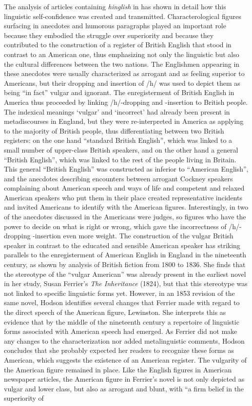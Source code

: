 The analysis of articles containing \emph{hinglish} in  has shown in detail how this linguistic self-confidence was created and transmitted. Characterological figures surfacing in anecdotes and humorous paragraphs played an important role because they embodied the struggle over superiority and because they contributed to the construction of a register of British English that stood in contrast to an American one, thus emphasizing not only the linguistic but also the cultural differences between the two nations. The Englishmen appearing in these anecdotes were usually characterized as arrogant and as feeling superior to Americans, but their dropping and insertion of /h/ was used to depict them as being “in fact” vulgar and ignorant. The enregisterment of British English in America thus proceeded by linking /h/-dropping and -insertion to British people. The indexical meanings ‘vulgar’ and ‘incorrect’ had already been present in metadiscourses in England, but they were re-interpreted in America as applying to the majority of British people, thus differentiating between two British registers: on the one hand “standard British English”, which was linked to a small number of upper-class British speakers, and on the other hand a general “British English”, which was linked to the rest of the people living in Britain. This general “British English” was constructed as inferior to “American English”, and the anecdotes describing encounters between arrogant Cockney speakers complaining about American speech and ways of life and competent and relaxed American speakers who put them in their place created representative incidents and invited Americans to identify with the American figures. Interestingly, in two of the anecdotes discussed in  the Americans were judges, so figures who have the power to decide on what is right or wrong, which gave the incorrectness of /h/-dropping \--insertion even more weight. The construction of the vulgar British speaker in contrast to the educated and sensible American speaker has striking parallels to the enregisterment of American English in England in the nineteenth century, as shown by  analysis of British fiction from 1800 to 1836. She finds that the stereotype of the “vulgar American” was already present in the earliest novel in her study, Susan Ferrier’s \textit{The Inheritance} (1824), but that this stereotype was not linked to specific linguistic forms yet. However, in an 1853 revision of the same novel, Hodson identifies several changes that Ferrier made with regard to the direct speech of the American figure, Lewinston. She interprets this as evidence that by the middle of the nineteenth century a repertoire of linguistic forms associated with American speech had emerged. As Ferrier did not make any changes to the characterization nor added metalinguistic comments, Hodson concludes that she probably expected her readers to recognize these forms as American, which suggests the existence of an American register. The vulgarity of the American figure remained in place. Like the English figures in American newspaper articles, the American figure in Ferrier’s novel is not only depicted as vulgar and lower class, but also as arrogant and blunt, with “a firm belief in the superiority of 